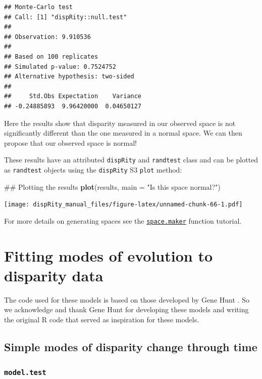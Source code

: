 \documentclass[]{book}
\newenvironment{Shaded}{\begin{snugshade}}{\end{snugshade}}
\newcommand{\KeywordTok}[1]{\textcolor[rgb]{0.13,0.29,0.53}{\textbf{#1}}}
\newcommand{\DataTypeTok}[1]{\textcolor[rgb]{0.13,0.29,0.53}{#1}}
\newcommand{\StringTok}[1]{\textcolor[rgb]{0.31,0.60,0.02}{#1}}
\newcommand{\NormalTok}[1]{#1}
\theoremstyle{definition}
\theoremstyle{definition}
\theoremstyle{definition}
\theoremstyle{remark}
\begin{document}
\begin{verbatim}
## Monte-Carlo test
## Call: [1] "dispRity::null.test"
## 
## Observation: 9.910536 
## 
## Based on 100 replicates
## Simulated p-value: 0.7524752 
## Alternative hypothesis: two-sided 
## 
##     Std.Obs Expectation    Variance 
## -0.24885893  9.96420000  0.04650127
\end{verbatim}

Here the results show that disparity measured in our observed space is
not significantly different than the one measured in a normal space. We
can then propose that our observed space is normal!

These results have an attributed \texttt{dispRity} and \texttt{randtest}
class and can be plotted as \texttt{randtest} objects using the
\texttt{dispRity} S3 \texttt{plot} method:

\begin{Shaded}
\begin{Highlighting}[]
\NormalTok{## Plotting the results}
\KeywordTok{plot}\NormalTok{(results, }\DataTypeTok{main =} \StringTok{"Is this space normal?"}\NormalTok{)}
\end{Highlighting}
\end{Shaded}

\texttt{[image: dispRity\_manual\_files/figure-latex/unnamed-chunk-66-1.pdf]}

For more details on generating spaces see the
\protect\hyperlink{Simulating-multidimensional-spaces}{\texttt{space.maker}}
function tutorial.

\section{Fitting modes of evolution to disparity
data}\label{fitting-modes-of-evolution-to-disparity-data}

The code used for these models is based on those developed by Gene Hunt
\citep{hunt2006fitting, hunt2012measuring, hunt2015simple}. So we
acknowledge and thank Gene Hunt for developing these models and writing
the original R code that served as inspiration for these models.

\subsection{Simple modes of disparity change through
time}\label{simple-modes-of-disparity-change-through-time}

\subsubsection{\texorpdfstring{\texttt{model.test}}{model.test}}\label{model.test}
\end{document}
